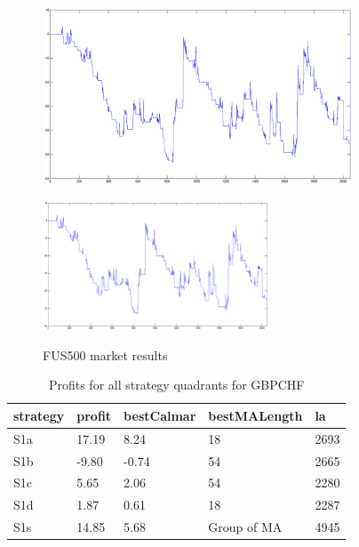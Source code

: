 \documentclass{tewiart}
\begin{document}
\begin{figure}[h]
\begin{minipage}{.49\linewidth}
\label{cztero}
\end{minipage}
\begin{minipage}{.49\linewidth}
\centering
\includegraphics[width=0.82\textwidth]{images/fus500D.eps}
\label{mansard}
\end{minipage}
\begin{minipage}{\linewidth}
\centering
\includegraphics[width=0.6\textwidth]{images/fus500S.eps}
\label{mansard}
\end{minipage}
\caption{FUS500 market results}
\end{figure}
\FloatBarrier
\newpage
\begin{table}[!t]
\caption{Profits for all strategy quadrants for GBPCHF}
 \begin{center}
 \begin{tabular}{|l|l|l|l|l|}
 \hline \textbf{strategy} & \textbf{profit} & \textbf{bestCalmar} & \textbf{bestMALength} & \textbf{la} \\ \hline
S1a & 17.19 & 8.24 & 18 & 2693\\ \hline
S1b & -9.80 & -0.74 & 54 & 2665\\ \hline
S1c & 5.65 & 2.06 & 54 & 2280\\ \hline
S1d & 1.87 & 0.61 & 18 & 2287\\ \hline
S1s & 14.85 & 5.68 & Group of MA & 4945\\
\hline \end{tabular}
 \end{center}
 \end{table}
\end{document}
